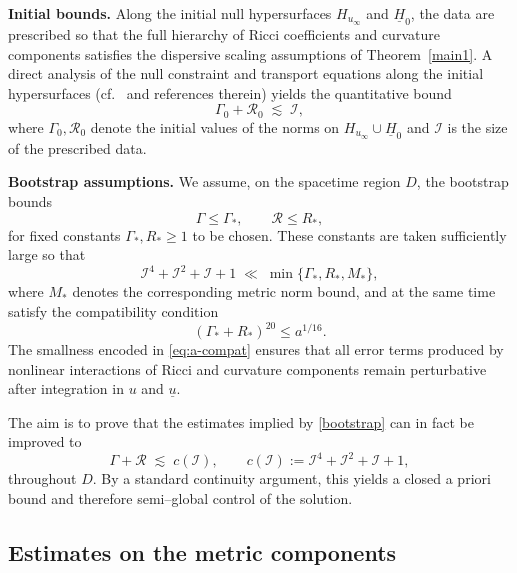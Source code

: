 \documentclass{amsart}
\newcommand{\ubar}{\underline{u}}
\begin{document}
{\medskip
\noindent
\textbf{Initial bounds.}
Along the initial null hypersurfaces $H_{u_\infty}$ and $\underline H_0$, the data are prescribed so that the full hierarchy of Ricci coefficients and curvature components satisfies the dispersive scaling assumptions of Theorem~\ref{main1}. A direct analysis of the null constraint and transport equations along the initial hypersurfaces (cf.\ \cite{AL17} and references therein) yields the quantitative bound
\begin{equation}\label{eq:initial-norm-bound}
\Gamma_0 + \mathcal R_0 \;\lesssim\; \mathcal I,
\end{equation}
where $\Gamma_0,\mathcal R_0$ denote the initial values of the norms on $H_{u_\infty}\cup \underline H_0$ and $\mathcal I$ is the size of the prescribed data.

\medskip
\noindent
\textbf{Bootstrap assumptions.}
We assume, on the spacetime region $D$, the bootstrap bounds
\begin{equation}\label{bootstrap}
\Gamma \le \Gamma_\ast,
\qquad
\mathcal R \le R_\ast,
\end{equation}
for fixed constants $\Gamma_\ast,R_\ast\ge 1$ to be chosen. These constants are taken sufficiently large so that
\begin{equation}\label{eq:bootstrap-gap}
\mathcal I^4+\mathcal I^2+\mathcal I+1
\;\ll\;
\min\{\Gamma_\ast, R_\ast, M_\ast\},
\end{equation}
where $M_\ast$ denotes the corresponding metric norm bound, and at the same time satisfy the compatibility condition
\begin{equation}\label{eq:a-compat}
(\Gamma_\ast+R_\ast)^{20}\le a^{1/16}.
\end{equation}
The smallness encoded in \eqref{eq:a-compat} ensures that all error terms produced by nonlinear interactions of Ricci and curvature components remain perturbative after integration in $u$ and $\ubar$.

\medskip
\noindent
The aim is to prove that the estimates implied by \eqref{bootstrap} can in fact be improved to
\[
\Gamma+\mathcal R
\;\lesssim\;
c(\mathcal I),
\qquad
c(\mathcal I):=\mathcal I^4+\mathcal I^2+\mathcal I+1,
\]
throughout $D$. By a standard continuity argument, this yields a closed a priori bound and therefore semi–global control of the solution.

\medskip
\subsection*{Estimates on the metric components}

}
\end{document}
